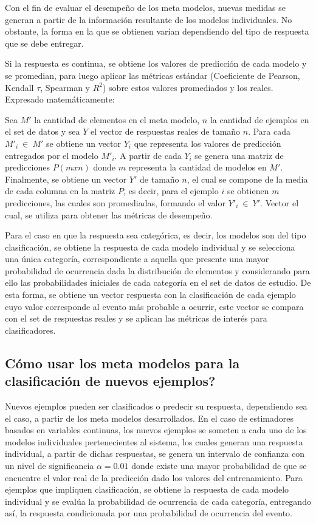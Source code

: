 Con el fin de evaluar el desempeño de los meta modelos, nuevas medidas se generan a partir de la información resultante de los modelos individuales. No obstante, la forma en la que se obtienen varían dependiendo del tipo de respuesta que se debe entregar.

Si la respuesta es continua, se obtiene los valores de predicción de cada modelo y se promedian, para luego aplicar las métricas estándar (Coeficiente de Pearson, Kendall $\tau$, Spearman y $R^{2}$) sobre estos valores promediados y los reales. Expresado matemáticamente:

Sea $M'$ la cantidad de elementos en el meta modelo, $n$ la cantidad de ejemplos en el set de datos y sea $Y$ el vector de respuestas reales de tamaño $n$. Para cada $M'_{i}\ \in\ M'$ se obtiene un vector $Y_{i}$ que representa los valores de predicción entregados por el modelo $M'_{i}$. A partir de cada $Y_{i}$ se genera una matriz de predicciones $P(mxn)$ donde $m$ representa la cantidad de modelos en $M'$. Finalmente, se obtiene un vector $Y'$ de tamaño $n$, el cual se compone de la media de cada columna en la matriz $P$, es decir, para el ejemplo $i$ se obtienen $m$ predicciones, las cuales son promediadas, formando el valor $Y'_{i}\ \in\  Y'$. Vector el cual, se utiliza para obtener las métricas de desempeño.

Para el caso en que la respuesta sea categórica, es decir, los modelos son del tipo clasificación, se obtiene la respuesta de cada modelo individual y se selecciona una única categoría, correspondiente a aquella que presente una mayor probabilidad de ocurrencia dada la distribución de elementos y considerando para ello las probabilidades iniciales de cada categoría en el set de datos de estudio. De esta forma, se obtiene un vector respuesta con la clasificación de cada ejemplo cuyo valor corresponde al evento más probable a ocurrir, este vector se compara con el set de respuestas reales y se aplican las métricas de interés para clasificadores.

\subsection{Cómo usar los meta modelos para la clasificación de nuevos ejemplos?}

Nuevos ejemplos pueden ser clasificados o predecir su respuesta, dependiendo sea el caso, a partir de los meta modelos desarrollados. En el caso de estimadores basados en variables continuas, los nuevos ejemplos se someten a cada uno de los modelos individuales pertenecientes al sistema, los cuales generan una respuesta individual, a partir de dichas respuestas, se genera un intervalo de confianza con un nivel de significancia $\alpha=0.01$ donde existe una mayor probabilidad de que se encuentre el valor real de la predicción dado los valores del entrenamiento. Para ejemplos que impliquen clasificación, se obtiene la respuesta de cada modelo individual y se evalúa la probabilidad de ocurrencia de cada categoría, entregando así, la respuesta condicionada por una probabilidad de ocurrencia del evento.

